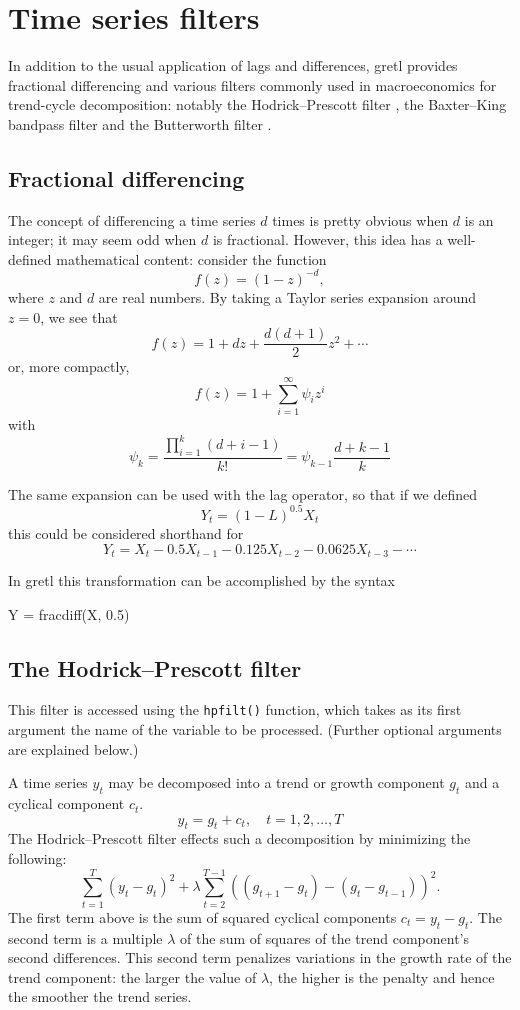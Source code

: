 \chapter{Time series filters}
\label{chap:tsfilter}

In addition to the usual application of lags and differences,
gretl provides fractional differencing and various filters
commonly used in macroeconomics for trend-cycle decomposition: notably
the Hodrick--Prescott filter \citep{hodrick97}, the Baxter--King
bandpass filter \citep{baxter-king99} and the Butterworth
filter \citep{butterworth30}.

\section{Fractional differencing}
\label{sec:fracdiff}

The concept of differencing a time series $d$ times is pretty obvious
when $d$ is an integer; it may seem odd when $d$ is
fractional. However, this idea has a well-defined mathematical
content: consider the function
\[
  f(z) = (1 - z)^{-d},
\]
where $z$ and $d$ are real numbers. By taking a Taylor series
expansion around $z=0$, we see that
\[
  f(z) = 1 + dz + \frac{d (d+1)}{2} z^2 + \cdots 
\]
or, more compactly,
\[
  f(z) = 1 + \sum_{i=1}^{\infty} \psi_i z^i
\]
with
\[
  \psi_k = \frac{\prod_{i=1}^{k} (d+i-1) }{k!} = \psi_{k-1} \frac{d+k-1}{k}
\]

The same expansion can be used with the lag operator, so that if we defined
\[
  Y_t = (1-L)^{0.5} X_t
\]
this could be considered shorthand for
\[
Y_t = X_t - 0.5 X_{t-1} - 0.125 X_{t-2} - 0.0625 X_{t-3} - \cdots 
\]
    
In gretl this transformation can be accomplished by the syntax 
\begin{code}
Y = fracdiff(X, 0.5)
\end{code}

\section{The Hodrick--Prescott filter}
\label{sec:hodrick-prescott}

This filter is accessed using the \verb+hpfilt()+ function, which
takes as its first argument the name of the variable to be processed.
(Further optional arguments are explained below.)

A time series $y_t$ may be decomposed into a trend or growth
component $g_t$ and a cyclical component $c_t$.  
%
\[
y_t = g_t + c_t, \quad t = 1,2,\dots,T
\]
%
The Hodrick--Prescott filter effects such a decomposition by
minimizing the following:
%
\[
    \sum_{t = 1}^T {(y_t - g_t )^2 } + \lambda \sum_{t = 2}^{T -
      1} \left((g_{t+1} - g_t) - (g_t - g_{t - 1} )\right)^2 .
\]
%
The first term above is the sum of squared cyclical components $c_t =
y_t - g_t$. The second term is a multiple $\lambda$ of the sum of
squares of the trend component's second differences. This
second term penalizes variations in the growth rate of the trend
component: the larger the value of $\lambda$, the higher is the
penalty and hence the smoother the trend series.

